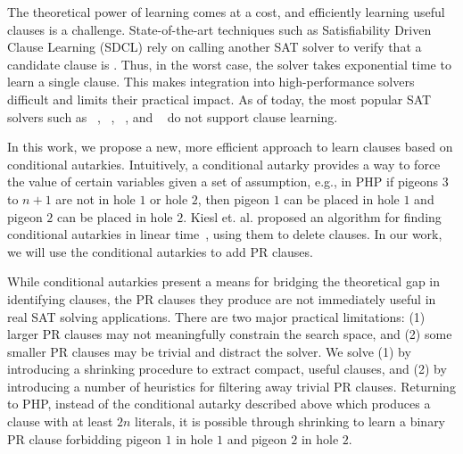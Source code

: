 The theoretical power of \pr learning comes at a cost, and efficiently learning useful \pr clauses is a challenge. State-of-the-art techniques such as Satisfiability Driven Clause Learning (SDCL) rely on calling another SAT solver to verify that a candidate clause is \pr \cite{sadical}. 
Thus, in the worst case, the solver takes exponential time to learn a single \pr clause. This makes integration into high-performance solvers difficult and limits their practical impact. As of today, the most popular SAT solvers such as \cadical~\cite{cadical}, \kissat~\cite{kissat}, \cryptoMiniSAT~\cite{cryptominisat}, and \lingeling~\cite{lingeling} do not support \pr clause learning.

In this work, we propose a new, more efficient approach to learn \pr clauses based on conditional autarkies. 
Intuitively, a conditional autarky provides a way to force the value of certain variables given a set of assumption, e.g., 
in PHP if pigeons $3 $ to $ n+1$ are not in hole $1$ or hole $2$, then pigeon $1$ can be placed in hole $1$ and pigeon $2$ can be placed in hole $2$. 
Kiesl et. al. proposed an algorithm for finding conditional autarkies in linear time~\cite{conditionalautarkies}, using them to delete clauses.
In our work, we  will use the conditional autarkies to add PR clauses. 
%

While conditional autarkies present a means for bridging the theoretical gap in identifying \pr clauses, 
the PR clauses they produce are not immediately useful in real SAT solving applications. 
There are two major practical limitations: (1) larger PR clauses may not meaningfully constrain the search space, and (2) some smaller PR clauses may be trivial and distract the solver. We solve (1) by introducing a shrinking procedure to extract compact, useful \pr clauses, and (2) by introducing a number of heuristics for filtering away trivial PR clauses. 
Returning to PHP, instead of the conditional autarky described above which produces a clause with at least $2n$ literals, it is possible through shrinking to learn a binary PR clause forbidding pigeon $1$ in hole $1$ and pigeon $2$ in hole $2$.

